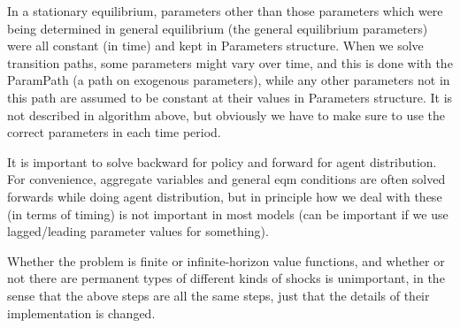 \documentclass[11pt,fleqn]{article}
\begin{document}
In a stationary equilibrium, parameters other than those parameters which were being determined in general equilibrium (the general equilibrium parameters) were all constant (in time) and kept in Parameters structure. When we solve transition paths, some parameters might vary over time, and this is done with the ParamPath (a path on exogenous parameters), while any other parameters not in this path are assumed to be constant at their values in Parameters structure. It is not described in algorithm above, but obviously we have to make sure to use the correct parameters in each time period.

It is important to solve backward for policy and forward for agent distribution. For convenience, aggregate variables and general eqm conditions are often solved forwards while doing agent distribution, but in principle how we deal with these (in terms of timing) is not important in most models (can be important if we use lagged/leading parameter values for something).

Whether the problem is finite or infinite-horizon value functions, and whether or not there are permanent types of different kinds of shocks is unimportant, in the sense that the above steps are all the same steps, just that the details of their implementation is changed.



\nocite{VFIToolkit}


\end{document}
